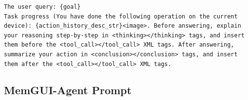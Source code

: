 \documentclass{llmxive}
\providecommand{\ourmethod}{MemGUI-Agent\xspace}
\begin{document}
\begin{tcolorbox}[
  promptstyle,
  title=\texttt{Prompt for ReAct-Style Qwen3-VL (per-step user prompt).},
]
\begin{Verbatim}[fontsize=\scriptsize,breaklines,breakanywhere]
The user query: {goal}
Task progress (You have done the following operation on the current device): {action_history_desc_str}<image>. Before answering, explain your reasoning step-by-step in <thinking></thinking> tags, and insert them before the <tool_call></tool_call> XML tags. After answering, summarize your action in <conclusion></conclusion> tags, and insert them after the <tool_call></tool_call> XML tags.
\end{Verbatim}
\end{tcolorbox}

\subsection{\ourmethod Prompt}
\label{sec:appendix-conact-prompt}
\end{document}
